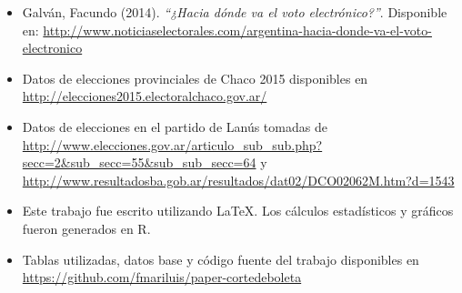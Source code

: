 \documentclass[12pt,a4paper]{article}
\begin{document}
\begin{itemize}
  \item Galván, Facundo (2014). \emph{“¿Hacia dónde va el voto electrónico?”}. Disponible en: \url{http://www.noticiaselectorales.com/argentina-hacia-donde-va-el-voto-electronico}
  \item Datos de elecciones provinciales de Chaco 2015 disponibles en \url{http://elecciones2015.electoralchaco.gov.ar/}
  \item Datos de elecciones en el partido de Lanús tomadas de
    \url{http://www.elecciones.gov.ar/articulo_sub_sub.php?secc=2&sub_secc=55&sub_sub_secc=64}
    y \url{http://www.resultadosba.gob.ar/resultados/dat02/DCO02062M.htm?d=1543}
  \item Este trabajo fue escrito utilizando \LaTeX. Los cálculos estadísticos y
    gráficos fueron generados en R.
  \item Tablas utilizadas, datos base y código fuente del trabajo disponibles en \url{https://github.com/fmariluis/paper-cortedeboleta}
\end{itemize}

\pagebreak

\tableofcontents
\listoftables
\listoffigures
\end{document}
